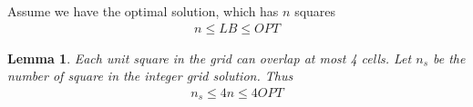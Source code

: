 \documentclass[12pt]{article}
\newtheorem{lem}[]{Lemma}
\begin{document}
Assume we have the optimal solution, which has $n$ squares
\begin{align*}
    n \le LB \le OPT
\end{align*}

\begin{lem}
    Each unit square in the grid can overlap at most 4 cells.
Let $n_s$ be the number of square in the integer grid solution. Thus
    \begin{align*}
        n_s \le 4n \le 4OPT
    \end{align*}
\end{lem}
\end{document}
